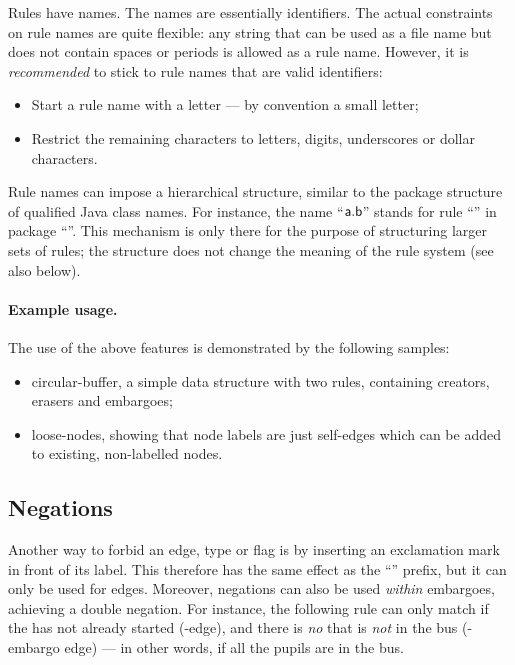 Rules have names. The names are essentially identifiers. The actual constraints
on rule names are quite flexible: any string that can be used as a file name
but does not contain spaces or periods is allowed as a rule name. However, it
is \emph{recommended} to stick to rule names that are valid identifiers:
%
\begin{itemize}\noitemsep
\item Start a rule name with a letter --- by convention a small letter;
\item Restrict the remaining characters to letters, digits, underscores or
  dollar characters.
\end{itemize}
%
Rule names can impose a hierarchical structure, similar to the package
structure of qualified Java class names. For instance, the name
``$\textsf{a.b}$'' stands for rule ``'' in package
``''. This mechanism is only there for the purpose of structuring
larger sets of rules; the structure does not change the meaning of the rule
system (see also  below).

\paragraph{Example usage.}

The use of the above features is demonstrated by the following \GROOVE samples:
%
\begin{itemize}\noitemsep
\item \textsf{circular-buffer}, a simple data structure with two rules,
  containing creators, erasers and embargoes;
\item \textsf{loose-nodes}, showing that node labels are just self-edges which
  can be added to existing, non-labelled nodes.
\end{itemize}

\subsection{Negations}

Another way to forbid an edge, type or flag is by inserting an exclamation mark
in front of its label. This therefore has the same effect as the ``\notP''
prefix, but it can only be used for edges. Moreover, negations can also be used
\emph{within} embargoes, achieving a double negation. For instance, the
following rule can only match if the  has not already started
(-edge), and there is \emph{no}  that is
\emph{not} in the bus (-embargo edge) --- in other words, if all the
pupils are in the bus.

